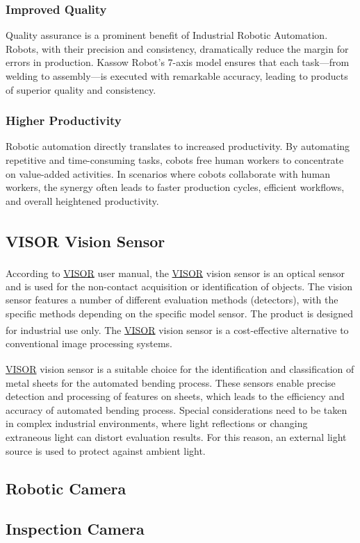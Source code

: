     \subsubsection*{Improved Quality}
    Quality assurance is a prominent benefit of Industrial Robotic Automation. Robots, with their precision and consistency, dramatically reduce the margin for errors in production. 
    Kassow Robot's 7-axis model ensures that each task—from welding to assembly—is executed with remarkable accuracy, leading to products of superior quality and consistency.

    \subsubsection*{Higher Productivity}

    Robotic automation directly translates to increased productivity. By automating repetitive and time-consuming tasks, cobots free human workers to concentrate on value-added activities. 
    In scenarios where cobots collaborate with human workers, the synergy often leads to faster production cycles, efficient workflows, and overall heightened productivity.

    
\subsection{VISOR\textsuperscript{\textregistered} Vision Sensor}
\label{sec:visor}
    According to \hyperref[acro:VISOR]{VISOR}\textsuperscript{\textregistered} \cite[page 22]{visor_user_manual} user manual, the \hyperref[acro:VISOR]{VISOR}\textsuperscript{\textregistered} vision sensor is an optical sensor and is used for the non-contact acquisition or identification of objects.
    The vision sensor features a number of different evaluation methods (detectors), with the specific methods
    depending on the specific model sensor. The product is designed for industrial use only. The \hyperref[acro:VISOR]{VISOR}\textsuperscript{\textregistered} vision sensor is a cost-effective alternative to conventional image processing systems.

    \hyperref[acro:VISOR]{VISOR}\textsuperscript{\textregistered} vision sensor is a suitable choice for the identification and classification of metal sheets for the automated bending process.
    These sensors enable precise detection and processing of features on sheets, which leads to the efficiency and accuracy of automated bending process.
    Special considerations need to be taken in complex industrial environments, where light reflections or changing extraneous light can distort evaluation results. For this reason, an external light source is used to protect against ambient light.

    \subsection{Robotic Camera}
    \label{subsec:robotic-camera}

    \subsection{Inspection Camera}
    \label{subsec:inspection-camera}